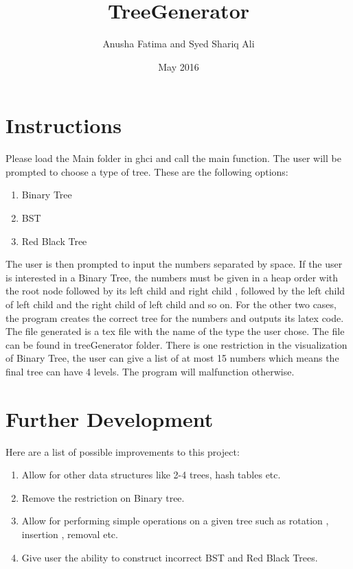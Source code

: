 \documentclass{article}
\title{TreeGenerator}
\author{Anusha Fatima and Syed Shariq Ali }
\date{May 2016}
\begin{document}
\maketitle

\section{Instructions}

Please load the Main folder in ghci and call the main function. 
The user will be prompted to choose a type of tree. These are the following options:
\begin{enumerate}
    \item Binary Tree
    \item BST 
    \item Red Black Tree
\end{enumerate}

The user is then prompted to input the numbers separated by space. If the user is interested in a Binary Tree, the numbers must be given in a heap order with the root node followed by its left child and right child , followed by the left child of left child and the right child of left child and so on. For the other two cases, the program creates the correct tree for the numbers and outputs its latex code.  \\

The file generated is a tex file with the name of the type the user chose. The file can be found in treeGenerator folder. There is one restriction in the visualization of Binary Tree, the user can give a list of at most 15 numbers which means the final tree can have 4 levels. The program will malfunction otherwise. 

\section{Further Development}
Here are a list of possible improvements to this project: 
\begin{enumerate}
    \item Allow for other data structures like 2-4 trees, hash tables etc.
    \item Remove the restriction on Binary tree.
    \item Allow for performing simple operations on a given tree such as rotation , insertion , removal etc.
    \item Give user the ability to construct incorrect BST and Red Black Trees.
\end{enumerate}
\end{document}
